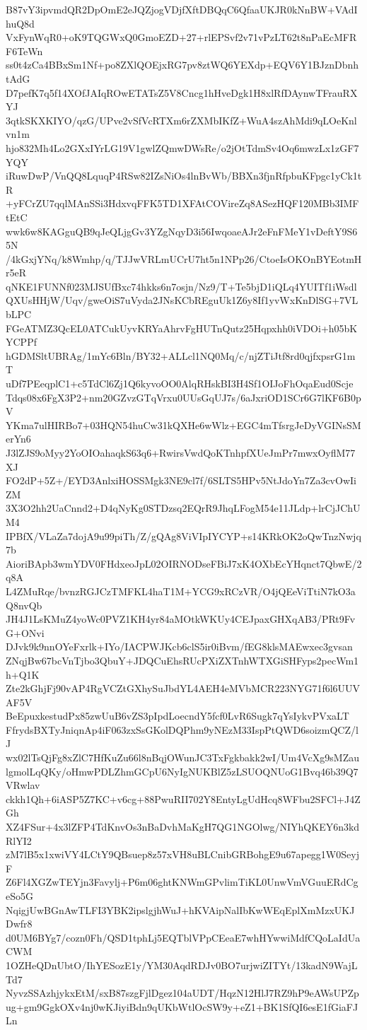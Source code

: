 B87vY3ipvmdQR2DpOmE2eJQZjogVDjfXftDBQqC6QfaaUKJR0kNnBW+VAdIhuQ8d
VxFynWqR0+oK9TQGWxQ0GmoEZD+27+rlEPSvf2v71vPzLT62t8nPaEcMFRF6TeWn
ss0t4zCa4BBxSm1Nf+po8ZXlQOEjxRG7pv8ztWQ6YEXdp+EQV6Y1BJznDbnhtAdG
D7pefK7q5f14XOfJAIqROwETATsZ5V8Cncg1hHveDgk1H8xlRfDAynwTFrauRXYJ
3qtkSKXKIYO/qzG/UPve2vSfVcRTXm6rZXMbIKfZ+WuA4szAhMdi9qLOeKnlvn1m
hjo832Mh4Lo2GXxIYrLG19V1gwlZQmwDWsRe/o2jOtTdmSv4Oq6mwzLx1zGF7YQY
iRuwDwP/VnQQ8LquqP4RSw82IZsNiOs4lnBvWb/BBXn3fjnRfpbuKFpgc1yCk1tR
+yFCrZU7qqlMAnSSi3HdxvqFFK5TD1XFAtCOVireZq8ASezHQF120MBb3IMFtEtC
wwk6w8KAGguQB9qJeQLjgGv3YZgNqyD3i56IwqoaeAJr2eFnFMeY1vDeftY9S65N
/4kGxjYNq/k8Wmhp/q/TJJwVRLmUCrU7ht5n1NPp26/CtoeIsOKOnBYEotmHr5eR
qNKE1FUNNf023MJSUfBxc74hkks6n7osjn/Nz9/T+Te5bjD1iQLq4YUITf1iWsdl
QXUsHHjW/Uqv/gweOiS7uVyda2JNsKCbREguUk1Z6y8If1yvWxKnDlSG+7VLbLPC
FGeATMZ3QcEL0ATCukUyvKRYaAhrvFgHUTnQutz25Hqpxhh0iVDOi+h05bKYCPPf
hGDMSltUBRAg/1mYc6Bln/BY32+ALLcl1NQ0Mq/c/njZTiJtf8rd0qjfxpsrG1mT
uDf7PEeqplC1+c5TdCl6Zj1Q6kyvoOO0AlqRHskBI3H4Sf1OIJoFhOqaEud0Scje
Tdqs08x6FgX3P2+nm20GZvzGTqVrxu0UUsGqUJ7s/6aJxriOD1SCr6G7lKF6B0pV
YKma7ulHIRBo7+03HQN54huCw31kQXHe6wWlz+EGC4mTfsrgJeDyVGINsSMerYn6
J3lZJS9oMyy2YoOIOahaqkS63q6+RwirsVwdQoKTnhpfXUeJmPr7mwxOyflM77XJ
FO2dP+5Z+/EYD3AnlxiHOSSMgk3NE9cl7f/6SLTS5HPv5NtJdoYn7Za3cvOwIiZM
3X3O2hh2UaCnnd2+D4qNyKg0STDzsq2EQrR9JhqLFogM54e11JLdp+lrCjJChUM4
IPBfX/VLaZa7dojA9u99piTh/Z/gQAg8ViVIpIYCYP+s14KRkOK2oQwTnzNwjq7b
AioriBApb3wmYDV0FHdxeoJpL02OIRNODseFBiJ7xK4OXbEcYHqnct7QbwE/2q8A
L4ZMuRqe/bvnzRGJCzTMFKL4haT1M+YCG9xRCzVR/O4jQEeViTtiN7kO3aQ8nvQb
JH4J1LsKMuZ4yoWc0PVZ1KH4yr84aMOtkWKUy4CEJpaxGHXqAB3/PRt9FvG+ONvi
DJvk9k9nnOYeFxrlk+IYo/IACPWJKcb6clS5ir0iBvm/fEG8klsMAEwxec3gvsan
ZNqjBw67bcVnTjbo3QbuY+JDQCuEhsRUcPXiZXTnhWTXGiSHFyps2pecWm1h+Q1K
Zte2kGhjFj90vAP4RgVCZtGXhySuJbdYL4AEH4eMVbMCR223NYG71f6l6UUVAF5V
BeEpuxkestudPx85zwUuB6vZS3pIpdLoecndY5fcf0LvR6Sugk7qYsIykvPVxaLT
FfrydsBXTyJniqnAp4iF063zxSsGKolDQPhm9yNEzM33IspPtQWD6soizmQCZ/lJ
wx02lTsQjFg8xZlC7HfKuZu66l8nBqjOWunJC3TxFgkbakk2wI/Um4VcXg9sMZau
lgmolLqQKy/oHmwPDLZhmGCpU6NyIgNUKBlZ5zLSUOQNUoG1Bvq46b39Q7VRwlav
ckkh1Qh+6iASP5Z7KC+v6cg+88PwuRII702Y8EntyLgUdHcq8WFbu2SFCl+J4ZGh
XZ4FSur+4x3lZFP4TdKnvOs3nBaDvhMaKgH7QG1NGOlwg/NIYhQKEY6n3kdRlYI2
zM7lB5x1xwiVY4LCtY9QBsuep8z57xVH8uBLCnibGRBohgE9u67apegg1W0SeyjF
Z6Fl4XGZwTEYjn3Favylj+P6m06ghtKNWmGPvlimTiKL0UnwVmVGuuERdCgeSo5G
NqigjUwBGnAwTLFI3YBK2ipslgjhWuJ+hKVAipNalIbKwWEqEplXmMzxUKJDwfr8
d0UM6BYg7/cozn0Fh/QSD1tphLj5EQTblVPpCEeaE7whHYwwiMdfCQoLaIdUaCWM
1OZHeQDnUbtO/IhYESozE1y/YM30AqdRDJv0BO7urjwiZITYt/13kadN9WajLTd7
NyvzSSAzhjykxEtM/sxB87szgFjlDgez104aUDT/HqzN12HlJ7RZ9hP9eAWsUPZp
ug+gm9GgkOXv4nj0wKJiyiBdn9qUKbWtlOcSW9y+eZ1+BK1SfQI6esE1fGiaFJLn
